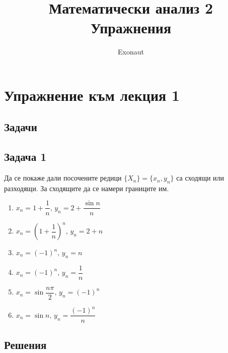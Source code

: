 \documentclass[a4paper,fleqn,12pt]{article}
\title{Математически анализ 2 \\ Упражнения}
\author{Exonaut}
\theoremstyle{definition}
\begin{document}
\maketitle

\newpage
{}

\tableofcontents
\newpage

\section{Упражнение към лекция 1}
\subsection{Задачи}

\subsection*{Задача 1}
Да се покаже дали посочените редици $\{ X_n \} = \{ x_n, y_n \}$ са сходящи или разходящи. За сходящите да се намери границите им.\\
\begin{enumerate}
\item $x_n = 1 + \dfrac{1}{n}, \, y_n = 2 + \dfrac{\sin{n}}{n}$
\item $x_n = \left( 1 + \dfrac{1}{n} \right) ^n, \, y_n = 2 + n $
\item $x_n = (-1)^n, \, y_n = n$
\item $x_n = (-1)^n, \, y_n = \dfrac{1}{n}$
\item $x_n =\sin{\dfrac{n \pi }{2}}, \, y_n = (-1)^n$
\item $x_n = \sin{n}, \, y_n = \dfrac{(-1)^n}{n}$
\end{enumerate}

\newpage
\subsection{Решения}
\end{document}
